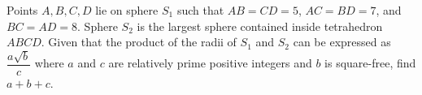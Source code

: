 Points $A,B,C,D$ lie on sphere $S_1$ such that $AB = CD = 5$, $AC = BD = 7$, and $BC = AD = 8$. Sphere $S_2$ is the largest sphere contained inside tetrahedron $ABCD$. Given that the product of the radii of $S_1$ and $S_2$ can be expressed as $\dfrac{a\sqrt{b}}{c}$ where $a$ and $c$ are relatively prime positive integers and $b$ is square-free, find $a + b + c$.
